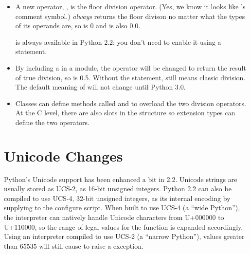 \documentclass{howto}
\begin{document}
\begin{itemize}

\item A new operator, \code{//}, is the floor division operator.
(Yes, we know it looks like \Cpp's comment symbol.)  \code{//}
\emph{always} returns the floor divison no matter what the types of
its operands are, so  is 0 and  is also
0.0.

\code{//} is always available in Python 2.2; you don't need to enable
it using a  statement.  

\item By including a  in a
module, the \code{/} operator will be changed to return the result of
true division, so  is 0.5.  Without the 
statement, \code{/} still means classic division.  The default meaning
of \code{/} will not change until Python 3.0.  

\item Classes can define methods called  and
 to overload the two division operators.  At the
C level, there are also slots in the  structure
so extension types can define the two operators.


\end{itemize}

\begin{seealso}


\end{seealso}


\section{Unicode Changes}

Python's Unicode support has been enhanced a bit in 2.2.  Unicode
strings are usually stored as UCS-2, as 16-bit unsigned integers.
Python 2.2 can also be compiled to use UCS-4, 32-bit unsigned
integers, as its internal encoding by supplying
 to the configure script.  When
built to use UCS-4 (a ``wide Python''), the interpreter can natively
handle Unicode characters from U+000000 to U+110000, so the range of
legal values for the  function is expanded
accordingly.  Using an interpreter compiled to use UCS-2 (a ``narrow
Python''), values greater than 65535 will still cause
 to raise a  exception.
\end{document}
